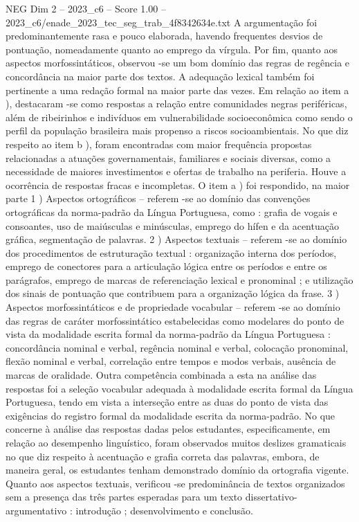 \begin{textsample}{NEG Dim 2 – 2023\_c6 – Score 1.00 – 2023\_c6/enade\_2023\_tec\_seg\_trab\_4f8342634e.txt}
A argumentação foi predominantemente rasa e pouco elaborada, havendo frequentes desvios de pontuação, nomeadamente quanto ao emprego da vírgula.
Por fim, quanto aos aspectos morfossintáticos, observou -se um bom domínio das regras de regência e concordância na maior parte dos textos.
A adequação lexical também foi pertinente a uma redação formal na maior parte das vezes.
Em relação ao item a ), destacaram -se como respostas a relação entre comunidades negras periféricas, além de ribeirinhos e indivíduos em vulnerabilidade socioeconômica como sendo o perfil da população brasileira mais propenso a riscos socioambientais.
No que diz respeito ao item b ), foram encontradas com maior frequência propostas relacionadas a atuações governamentais, familiares e sociais diversas, como a necessidade de maiores investimentos e ofertas de trabalho na periferia.
Houve a ocorrência de respostas fracas e incompletas.
O item a ) foi respondido, na maior parte 1 ) Aspectos ortográficos – referem -se ao domínio das convenções ortográficas da norma-padrão da Língua Portuguesa, como : grafia de vogais e consoantes, uso de maiúsculas e minúsculas, emprego do hífen e da acentuação gráfica, segmentação de palavras. 2 ) Aspectos textuais – referem -se ao domínio dos procedimentos de estruturação textual : organização interna dos períodos, emprego de conectores para a articulação lógica entre os períodos e entre os parágrafos, emprego de marcas de referenciação lexical e pronominal ; e utilização dos sinais de pontuação que contribuem para a organização lógica da frase. 3 ) Aspectos morfossintáticos e de propriedade vocabular – referem -se ao domínio das regras de caráter morfossintático estabelecidas como modelares do ponto de vista da modalidade escrita formal da norma-padrão da Língua Portuguesa : concordância nominal e verbal, regência nominal e verbal, colocação pronominal, flexão nominal e verbal, correlação entre tempos e modos verbais, ausência de marcas de oralidade.
Outra competência combinada a esta na análise das respostas foi a seleção vocabular adequada à modalidade escrita formal da Língua Portuguesa, tendo em vista a interseção entre as duas do ponto de vista das exigências do registro formal da modalidade escrita da norma-padrão.
No que concerne à análise das respostas dadas pelos estudantes, especificamente, em relação ao desempenho linguístico, foram observados muitos deslizes gramaticais no que diz respeito à acentuação e grafia correta das palavras, embora, de maneira geral, os estudantes tenham demonstrado domínio da ortografia vigente.
Quanto aos aspectos textuais, verificou -se predominância de textos organizados sem a presença das três partes esperadas para um texto dissertativo-argumentativo : introdução ; desenvolvimento e conclusão.

\end{textsample}
